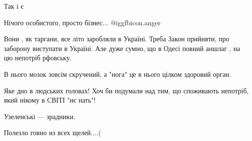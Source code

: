 \begin{itemize}
Так і є

 
Нічого особистого, просто бізнес... @igg{fbicon.anger} 

 

Вони , як таргани, все літо заробляли в Україні. Треба Закон прийняти, про
заборону виступати в Україні. Але дуже сумно, що в Одесі повний аншлаг , на цю
непотріб рфовську.


 
В нього мозок зовсім скручений, а "нога" це в нього цілком здоровий орган.

 
Яке дно в людських головах! Хоч би подумали над тим, що споживають непотріб, який нікому в СВІТІ "нє нать"!

 
Узеленські — зрадники.

 
Полезло говно из всех щелей....(

 

\end{itemize}
